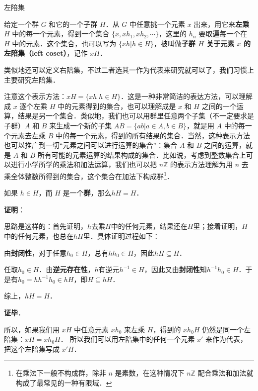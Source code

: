 

\begin{definition}{左陪集}

给定一个群 $G$ 和它的一个子群 $H$．从 $G$ 中任意挑一个元素 $x$ 出来，用它来\textbf{左乘} $H$ 中的每一个元素，得到一个集合 $\{x, xh_1, xh_2, \cdots\}$，这里的 $h_n$ 要取遍每一个在 $H$ 中的元素．这个集合，也可以写为 $\{xh|h\in H\}$，被叫做\textbf{子群 $H$ 关于元素 $x$ 的左陪集（left coset）}，记作 $xH$． 

\end{definition}

类似地还可以定义右陪集，不过二者选其一作为代表来研究就可以了，我们习惯上主要研究左陪集．

注意这个表示方法：$xH=\{xh|h\in H\}$．这是一种非常简洁的表达方法，可以理解成 $x$ 逐个左乘 $H$ 中的元素得到的集合，也可以理解成是 $x$ 和 $H$ 之间的一个运算，结果是另一个集合．类似地，我们也可以用群里任意两个子集（不一定要求是子群）$A$ 和 $B$ 来生成一个新的子集 $AB=\{ab|a\in A, b\in B\}$，就是用 $A$ 中的每一个元素去左乘 $B$ 中的每一个元素，得到的所有结果的集合．当然，这种表示方法也可以推广到一切“元素之间可以进行运算的集合”：集合 $A$ 和 $B$ 之间的运算，就是 $A$ 和 $B$ 所有可能的元素运算的结果构成的集合．比如说，考虑到整数集合上可以进行小学所学的乘法和加法运算，我们也可以把 $n\mathbb{Z}$ 的表示方法理解为用 $n$ 去乘全体整数所得到的集合，这个集合在加法下构成群\footnote{在乘法下一般不构成群，除非 $n$ 是素数，在这种情况下 $n\mathbb{Z}$ 配合乘法和加法就构成了最常见的一种有限域．}．

\begin{theorem}{}
如果 $h\in H$，而 $H$ 是一个\textbf{群}，那么$hH=H$．
\end{theorem}

\textbf{证明}：

思路是这样的：首先证明，$h$去乘$H$中的任何元素，结果还在$H$里；接着证明，$H$中的任何元素，也总在$hH$里．具体证明过程如下：

由\textbf{封闭性}，对于任意$h_0\in H$，总有$hh_0\in H$，因此$hH\subseteq H$．

任取$h_0\in H$．由\textbf{逆元存在性}，$h$有逆元$h^{-1}\in H$，因此又由\textbf{封闭性}知$h^{-1}h_0\in H$．于是有$h_0=hh^{-1}h_0\in hH$，即$H\subseteq hH$．

综上，$hH=H$．

\textbf{证毕}．

所以，如果我们用 $xH$ 中任意元素 $xh_0$ 来左乘 $H$，得到的 $xh_0H$ 仍然是同一个左陪集：$xH=xh_0H$． 所以我们可以用左陪集中的任何一个元素 $x'$ 来作为代表，把这个左陪集写成 $x'H$．

